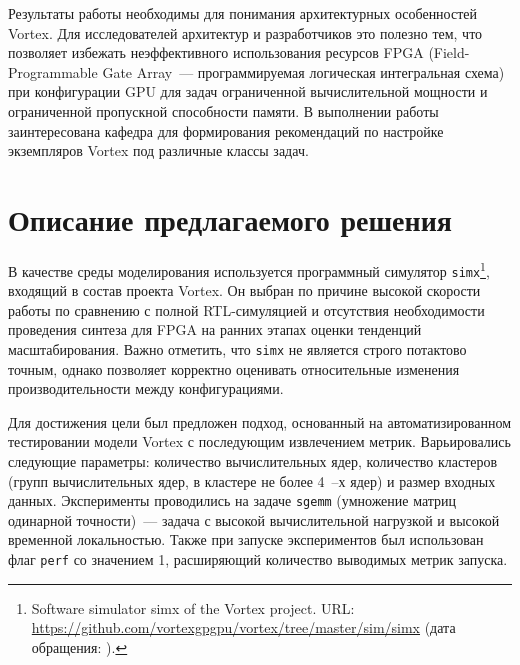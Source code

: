 \documentclass[a4paper]{article}
\begin{document}
Результаты работы необходимы для понимания архитектурных особенностей Vortex. Для исследователей архитектур и разработчиков это полезно тем, что позволяет избежать неэффективного использования ресурсов FPGA (Field-Programmable Gate Array~--- программируемая логическая интегральная схема) при конфигурации GPU для задач ограниченной вычислительной мощности и ограниченной пропускной способности памяти. В выполнении работы заинтересована кафедра для формирования рекомендаций по настройке экземпляров Vortex под различные классы задач.

\section{Описание предлагаемого решения}

В качестве среды моделирования используется программный симулятор \texttt{simx}\footnote{Software simulator simx of the Vortex project. URL: \url{https://github.com/vortexgpgpu/vortex/tree/master/sim/simx} (дата обращения: ).}, входящий в состав проекта Vortex. Он выбран по причине высокой скорости работы по сравнению с полной RTL-симуляцией и отсутствия необходимости проведения синтеза для FPGA на ранних этапах оценки тенденций масштабирования. Важно отметить, что \texttt{simx} не является строго потактово точным, однако позволяет корректно оценивать относительные изменения производительности между конфигурациями.

Для достижения цели был предложен подход, основанный на автоматизированном тестировании модели Vortex с последующим извлечением метрик. Варьировались следующие параметры: количество вычислительных ядер, количество кластеров (групп вычислительных ядер, в кластере не более 4~--х ядер) и размер входных данных. Эксперименты проводились на задаче \texttt{sgemm} (умножение матриц одинарной точности)~--- задача с высокой вычислительной нагрузкой и высокой временной локальностью. Также при запуске экспериментов был использован флаг \texttt{perf} со значением 1, расширяющий количество выводимых метрик запуска.
\end{document}
